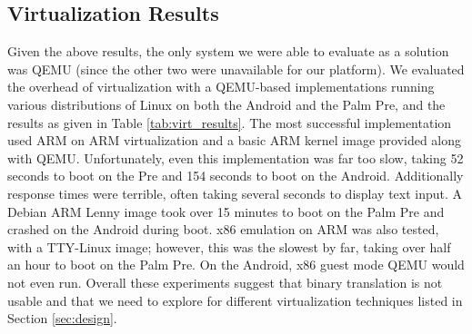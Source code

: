\subsection{Virtualization Results}

Given the above results, the only system we were able to evaluate as a solution was QEMU (since the other two were unavailable for our platform).  We evaluated the overhead of virtualization with a QEMU-based implementations running various distributions of Linux on both the Android and the Palm Pre, and the results as given in Table \ref{tab:virt_results}. The most successful implementation used ARM on ARM virtualization and a basic ARM kernel image provided along with QEMU. Unfortunately, even this implementation was far too slow, taking 52 seconds to boot on the Pre and 154 seconds to boot on the Android. Additionally response times were terrible, often taking several seconds to display text input. A Debian ARM Lenny image took over 15 minutes to boot on the Palm Pre and crashed on the Android during boot. x86 emulation on ARM was also tested, with a TTY-Linux image; however, this was the slowest by far, taking over half an hour to boot on the Palm Pre. On the Android, x86 guest mode QEMU would not even run. Overall these experiments suggest that binary translation is not usable and that we need to explore for different virtualization techniques listed in Section \ref{sec:design}.


